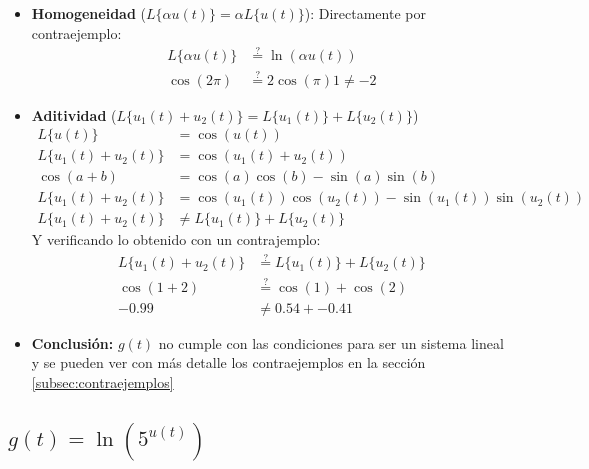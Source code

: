 \documentclass[12pt,a4paper]{article}
\begin{document}
\begin{itemize}
    \item \textbf{Homogeneidad} ($L\{\alpha u(t)\} = \alpha L\{u(t)\}$): Directamente por contraejemplo:
        \begin{align*}
            L\{\alpha u(t)\} &\stackrel{?}{=} \ln(\alpha u(t))\\
            \cos (2\pi) &\stackrel{?}{=} 2 \cos (\pi)
            1 \neq -2 
        \end{align*}
    \item \textbf{Aditividad} ($L\{u_1(t)+u_2(t)\}=L\{u_1(t)\}+ L\{u_2(t)\}$)
    \begin{align*}
        L\{u(t)\} &= \cos(u(t))\\
        L\{u_1(t)+u_2(t)\} &= \cos (u_1(t)+u_2(t))\\
        \cos(a+b) &= \cos(a)\cos(b)-\sin(a)\sin(b)\\
        L\{u_1(t)+u_2(t)\} &= \cos(u_1(t))\cos(u_2(t))-\sin(u_1(t))\sin(u_2(t))\\
        L\{u_1(t)+u_2(t)\} &\neq L\{u_1(t)\}+L\{u_2(t)\} 
    \end{align*}
    Y verificando lo obtenido con un contrajemplo:
    \begin{align*}
        L\{u_1(t)+u_2(t)\} &\stackrel{?}{=} L\{u_1(t)\}+ L\{u_2(t)\}\\
        \cos(1+2) &\stackrel{?}{=} \cos(1) + \cos(2)\\
         -0.99 &\neq 0.54 + -0.41
    \end{align*}
    \item \textbf{Conclusión:} $g(t)$ no cumple con las condiciones para ser un sistema lineal y se pueden ver con más detalle los contraejemplos en la sección \ref{subsec:contraejemplos}
\end{itemize}

\subsection{$g(t)=\ln(5^{u(t)})$}
\end{document}
